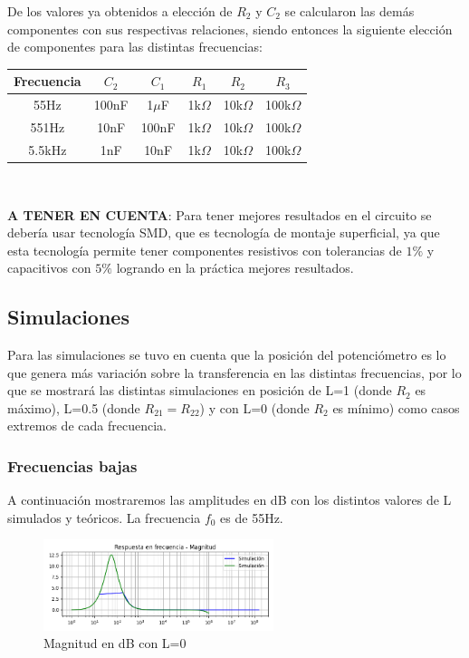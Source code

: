 De los valores ya obtenidos a elección de $R_2$ y $C_2$ se calcularon las demás componentes con sus respectivas relaciones, siendo entonces la siguiente elección de componentes para las distintas frecuencias:

\begin{table}[htb]
\centering
\begin{tabular}{|c|c|c|c|c|c|}
\hline
\textbf{Frecuencia} & \textbf{$C_2$} & \textbf{$C_1$} & \textbf{$R_1$} & \textbf{$R_2$} & \textbf{$R_3$} \\ \hline
55Hz                & 100nF          & 1$\mu$F          & 1k$\Omega$     & 10k$\Omega$    & 100k$\Omega$   \\ \hline
551Hz               & 10nF           & 100nF           & 1k$\Omega$     & 10k$\Omega$    & 100k$\Omega$   \\ \hline
5.5kHz              & 1nF            & 10nF            & 1k$\Omega$     & 10k$\Omega$    & 100k$\Omega$   \\ \hline
\end{tabular}
\end{table}
\


\textbf{A TENER EN CUENTA}: Para tener mejores resultados en el circuito se debería usar tecnología SMD, que es tecnología de montaje superficial, ya que esta tecnología permite tener componentes resistivos con tolerancias de $1\%$ y capacitivos con $5\%$ logrando en la práctica mejores resultados. 


\subsection{Simulaciones}

Para las simulaciones se tuvo en cuenta que la posición del potenciómetro es lo que genera más variación sobre la transferencia en las distintas frecuencias, por lo que se mostrará las distintas simulaciones en posición de L=1 (donde $R_2$ es máximo), L=0.5 (donde $R_{21} = R_{22}$) y con L=0 (donde $R_2$ es mínimo) como casos extremos de cada frecuencia.

\subsubsection{Frecuencias bajas}
A continuación mostraremos las amplitudes en dB con los distintos valores de L simulados y teóricos. La frecuencia $f_0$ es de 55Hz.

\begin{figure}[H]
	\centering
	\includegraphics[width=0.6\textwidth]{../Ejercicio4-EcualizadorDeFase/Informe/lowFrecL000Mag.png} 
	\caption{Magnitud en dB con L=0}
	\label{lowMagL00}
\end{figure}
	
